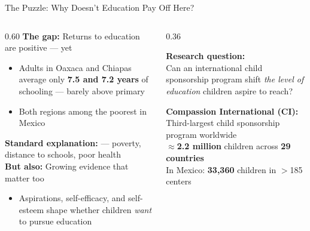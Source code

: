 \documentclass[aspectratio=169, 10pt]{beamer}
\begin{document}
\begin{frame}{The Puzzle: Why Doesn't Education Pay Off Here?}
  \begin{columns}
    \begin{column}{0.60\textwidth}
      \textbf{The gap:} Returns to education are positive — yet 
      \begin{itemize}
        \item Adults in Oaxaca and Chiapas average only \textbf{7.5 and 7.2 years} of schooling — barely above primary
        \item Both regions among the poorest in Mexico
      \end{itemize}
      \vspace{0.5em}
      \textbf{Standard explanation:}  — poverty, distance to schools, poor health\\[0.4em]
      \textbf{But also:} Growing evidence that  matter too
      \begin{itemize}
        \item Aspirations, self-efficacy, and self-esteem shape whether children \textit{want} to pursue education
        \citep{Cunha2009, Dalton2016, Heckman2012}
      \end{itemize}
    \end{column}
    \begin{column}{0.36\textwidth}
      \begin{methodbox}
        \textbf{Research question:}\\[0.3em]
        Can an international child sponsorship program shift \textit{the level of education} children aspire to reach?
      \end{methodbox}
      \vspace{0.4em}
      \begin{keybox}
        \small \textbf{Compassion International (CI):} Third-largest child sponsorship program worldwide\\[0.2em]
        $\approx$\textbf{2.2 million} children across \textbf{29 countries}\\
        In Mexico: \textbf{33,360} children in $>$185 centers
      \end{keybox}
    \end{column}
  \end{columns}
\end{frame}
\end{document}
